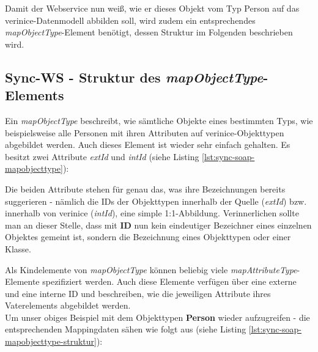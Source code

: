 \documentclass[a4paper,10pt]{book}
\begin{document}
Damit der Webservice nun weiß, wie er dieses Objekt vom Typ Person auf das verinice-Datenmodell abbilden soll,
wird zudem ein entsprechendes \textit{mapObjectType}-Element benötigt, dessen Struktur im Folgenden
beschrieben wird.

\subsection{Sync-WS - Struktur des \textit{mapObjectType}-Elements}

Ein \textit{mapObjectType} beschreibt, wie sämtliche Objekte eines bestimmten Typs, wie beispielsweise
alle Personen mit ihren Attributen auf verinice-Objekttypen abgebildet werden. Auch dieses Element ist wieder
sehr einfach gehalten. Es besitzt zwei Attribute \textit{extId} und
\textit{intId} (siehe Listing \ref{lst:sync-soap-mapobjecttype}):
\newline
\lstset{language=XML}



Die beiden Attribute stehen für genau das, was ihre Bezeichnungen bereits
suggerieren - nämlich die IDs der Objekttypen innerhalb der Quelle
(\textit{extId}) bzw. innerhalb von verinice (\textit{intId}), eine simple
1:1-Abbildung. Verinnerlichen sollte man an dieser Stelle, dass mit \textbf{ID}
nun kein eindeutiger Bezeichner eines einzelnen Objektes gemeint ist, sondern
die Bezeichnung eines Objekttypen oder einer Klasse.

Als Kindelemente von \textit{mapObjectType} können beliebig viele \textit{mapAttributeType}-Elemente spezifiziert werden.
Auch diese Elemente verfügen über eine externe und eine interne ID und beschreiben, wie die jeweiligen Attribute
ihres Vaterelements abgebildet werden.
\newline\\
Um unser obiges Beispiel mit dem Objekttypen \textbf{Person} wieder aufzugreifen - die entsprechenden Mappingdaten
sähen wie folgt aus (siehe Listing \ref{lst:sync-soap-mapobjecttype-struktur}):
\newline
\lstset{language=XML}

\end{document}
